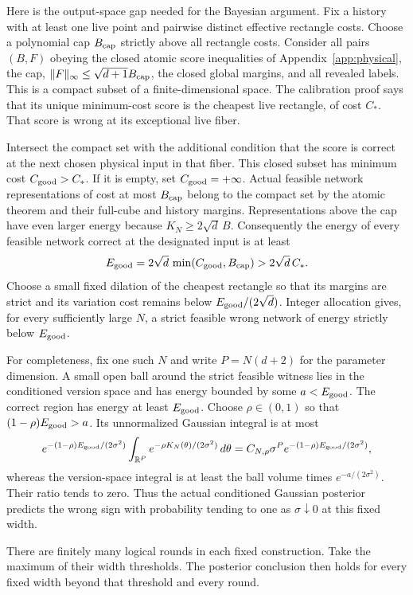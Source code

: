 Here is the output-space gap needed for the Bayesian argument. Fix a
history with at least one live point and pairwise distinct effective
rectangle costs. Choose a polynomial cap $B_{\rm cap}$ strictly above
all rectangle costs. Consider all pairs $(B,F)$ obeying the closed
atomic score inequalities of Appendix~\ref{app:physical}, the cap,
$\|F\|_\infty\le\sqrt{d+1}B_{\rm cap}$, the closed global margins,
and all revealed labels. This is a compact subset of a finite-dimensional
space. The calibration proof says that its unique
minimum-cost score is the cheapest live rectangle, of cost $C_*$.
That score is wrong at its exceptional live fiber.

Intersect the compact set with the additional condition that the score
is correct at the next chosen physical input in that fiber. This closed
subset has minimum cost $C_{\rm good}>C_*$. If it is empty, set
$C_{\rm good}=+\infty$. Actual feasible network representations of
cost at most $B_{\rm cap}$ belong to the compact set by the atomic
theorem and their full-cube and history margins. Representations above the cap have even
larger energy because $K_N\ge2\sqrt d\,B$. Consequently the energy of
every feasible network correct at the designated input is at least
\[
 E_{\rm good}=2\sqrt d\,\min(C_{\rm good},B_{\rm cap})
             >2\sqrt d\,C_*.
\]
Choose a small fixed dilation of the cheapest rectangle so that its
margins are strict and its variation cost remains below
$E_{\rm good}/(2\sqrt d)$. Integer allocation gives, for every
sufficiently large $N$, a strict feasible wrong network of energy
strictly below $E_{\rm good}$.

For completeness, fix one such $N$ and write $P=N(d+2)$ for the
parameter dimension. A small open ball around the strict feasible
witness lies in the conditioned version space and has energy bounded
by some $a<E_{\rm good}$. The correct region has energy at least
$E_{\rm good}$. Choose $\rho\in(0,1)$ so that
$(1-\rho)E_{\rm good}>a$. Its unnormalized Gaussian integral is at most
\[
 e^{-(1-\rho)E_{\rm good}/(2\sigma^2)}
 \int_{\mathbb R^P}e^{-\rho K_N(\theta)/(2\sigma^2)}\,d\theta
 =C_{N,\rho}\sigma^P
    e^{-(1-\rho)E_{\rm good}/(2\sigma^2)},
\]
whereas the version-space integral is at least the ball volume times
$e^{-a/(2\sigma^2)}$. Their ratio tends to zero. Thus the actual
conditioned Gaussian posterior predicts the wrong sign with probability
tending to one as $\sigma\downarrow0$ at this fixed width.

There are finitely many logical rounds in each fixed construction.
Take the maximum of their width thresholds. The posterior conclusion
then holds for every fixed width beyond that threshold and every round.


